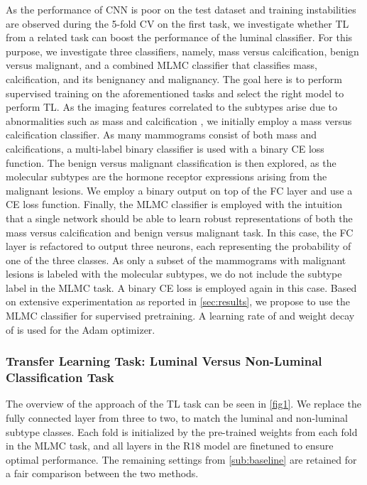 \documentclass{article}
\begin{document}
  

As the performance of CNN is poor on the test dataset and training instabilities are observed during the 5-fold CV on the first task, we investigate whether TL from a related task can boost the performance of the luminal classifier. For this purpose, we investigate three classifiers, namely, mass versus calcification, benign versus malignant, and a combined MLMC classifier that classifies mass, calcification, and its benignancy and malignancy. The goal here is to perform supervised training on the aforementioned tasks and select the right model to perform TL. As the imaging features correlated to the subtypes arise due to abnormalities such as mass and calcification \cite {horvath2021molecular, cho2016molecular, boisserie2013correlation}, we initially employ a mass versus calcification classifier. As many mammograms consist of both mass and calcifications, a multi-label binary classifier is used with a binary CE loss function. The benign versus malignant classification is then explored, as the molecular subtypes are the hormone receptor expressions arising from the malignant lesions. We employ a binary output on top of the FC layer and use a CE loss function. Finally, the MLMC classifier is employed with the intuition that a single network should be able to learn robust representations of both the mass versus calcification and benign versus malignant task. In this case, the FC layer is refactored to output three neurons, each representing the probability of one of the three classes. As only a subset of the mammograms with malignant lesions is labeled with the molecular subtypes, we do not include the subtype label in the MLMC task. A binary CE loss is employed again in this case. Based on extensive experimentation as reported in \cref{sec:results}, we propose to use the MLMC classifier for supervised pretraining. A learning rate of  and weight decay of  is used for the Adam optimizer.  

\subsubsection {Transfer Learning Task: Luminal Versus Non-Luminal Classification Task} 

The overview of the approach of the TL task can be seen in \cref{fig1}. We replace the fully connected layer from three to two, to match the luminal and non-luminal subtype classes. Each fold is initialized by the pre-trained weights from each fold in the MLMC task, and all layers in the R18 model are finetuned to ensure optimal performance. The remaining settings from \cref{sub:baseline} are retained for a fair comparison between the two methods. 
\end{document}
